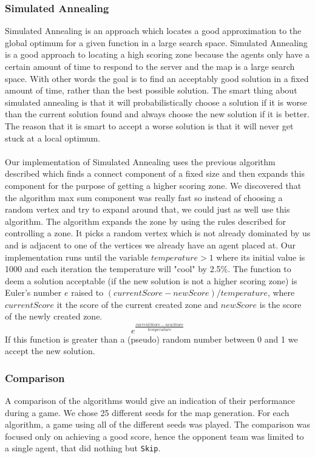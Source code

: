 \documentclass[11pt]{article}
\begin{document}
\subsubsection{Simulated Annealing}
Simulated Annealing is an approach which locates a good approximation to the global optimum for a given function in a large search space. Simulated Annealing is a good approach to locating a high scoring zone because the agents only have a certain amount of time to respond to the server and the map is a large search space. With other words the goal is to find an acceptably good solution in a fixed amount of time, rather than the best possible solution. The smart thing about simulated annealing is that it will probabilistically choose a solution if it is worse than the current solution found and always choose the new solution if it is better. The reason that it is smart to accept a worse solution is that it will never get stuck at a local optimum.\\
\\
Our implementation of Simulated Annealing uses the previous algorithm described which finds a connect component of a fixed size and then expands this component for the purpose of getting a higher scoring zone. We discovered that the algorithm max sum component was really fast so instead of choosing a random vertex and try to expand around that, we could just as well use this algorithm. The algorithm expands the zone by using the rules described for controlling a zone. It picks a random vertex which is not already dominated by us and is adjacent to one of the vertices we already have an agent placed at. Our implementation runs until the variable $temperature > 1$ where its initial value is 1000 and each iteration the temperature will "cool" by 2.5\%. The function to deem a solution acceptable (if the new solution is not a higher scoring zone) is Euler's number $e$ raised to $(currentScore - newScore) / temperature$, where $currentScore$ it the score of the current created zone and $newScore$ is the score of the newly created zone.
$$e^\frac{currentScore - newScore}{temperature}$$
If this function is greater than a (pseudo) random number between 0 and 1 we accept the new solution.

\subsubsection{Comparison}
A comparison of the algorithms would give an indication of their performance during a game. We chose 25 different seeds for the map generation. For each algorithm, a game using all of the different seeds was played. The comparison was focused only on achieving a good score, hence the opponent team was limited to a single agent, that did nothing but {\tt Skip}.
\end{document}
